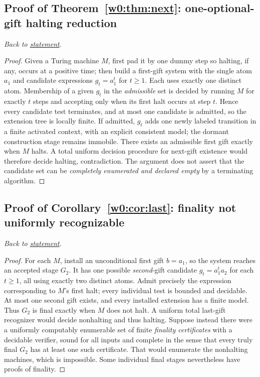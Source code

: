 \documentclass[11pt,letterpaper]{article}
\theoremstyle{definition}\newtheorem{definition}[theorem]{Definition}\newtheorem{example}[theorem]{Example}
\theoremstyle{remark}\newtheorem{remark}[theorem]{Remark}
\begin{document}
\subsection{Proof of Theorem~\ref{w0:thm:next}: one-optional-gift halting reduction}\label{w0:pr:next}
\textit{Back to \hyperref[w0:thm:next]{statement}.}
\begin{proof}
Given a Turing machine $M$, first pad it by one dummy step so halting, if any, occurs at a positive time; then build a first-gift system with the single atom $a_1$ and candidate expressions $g_t=a_1^t$ for $t\ge1$. Each uses exactly one distinct atom. Membership of a given $g_t$ in the \emph{admissible} set is decided by running $M$ for exactly $t$ steps and accepting only when its first halt occurs at step $t$. Hence every candidate test terminates, and at most one candidate is admitted, so the extension tree is locally finite. If admitted, $g_t$ adds one newly labeled transition in a finite activated context, with an explicit consistent model; the dormant construction stage remains immobile. There exists an admissible first gift exactly when $M$ halts. A total uniform decision procedure for next-gift existence would therefore decide halting, contradiction. The argument does not assert that the candidate set can be \emph{completely enumerated and declared empty} by a terminating algorithm.
\end{proof}

\subsection{Proof of Corollary~\ref{w0:cor:last}: finality not uniformly recognizable}\label{w0:pr:last}
\textit{Back to \hyperref[w0:cor:last]{statement}.}
\begin{proof}
For each $M$, install an unconditional first gift $b=a_1$, so the system reaches an accepted stage $G_2$. It has one possible \emph{second}-gift candidate $g_t=a_1^t a_2$ for each $t\ge1$, all using exactly two distinct atoms. Admit precisely the expression corresponding to $M$'s first halt; every individual test is bounded and decidable. At most one second gift exists, and every installed extension has a finite model. Thus $G_2$ is final exactly when $M$ does not halt. A uniform total last-gift recognizer would decide nonhalting and thus halting. Suppose instead there were a uniformly computably enumerable set of finite \emph{finality certificates} with a decidable verifier, sound for all inputs and complete in the sense that every truly final $G_2$ has at least one such certificate. That would enumerate the nonhalting machines, which is impossible. Some individual final stages nevertheless have proofs of finality.
\end{proof}
\end{document}
